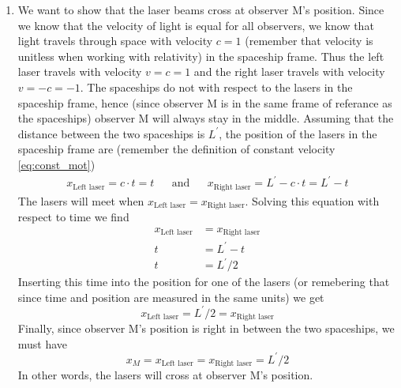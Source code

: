 \documentclass[a4paper,10pt,english]{article}
\begin{document}
\begin{enumerate}
\item We want to show that the laser beams cross at observer M's position. Since we know that the velocity of light is equal for all observers, we know that light travels through space with velocity $c=1$ (remember that velocity is unitless when working with relativity) in the spaceship frame. Thus the left laser travels with velocity $v=c=1$ and the right laser travels with velocity $v=-c=-1$. The spaceships do not with respect to the lasers in the spaceship frame, hence (since observer M is in the same frame of referance as the spaceships) observer M will always stay in the middle. Assuming that the distance between the two spaceships is $L^{\prime}$, the position of the lasers in the spaceship frame are (remember the definition of constant velocity \ref{eq:const_mot})
\begin{align*}
x_{\text{Left laser}}=c\cdot t=t &&\text{and}&& x_{\text{Right laser}}=L^{\prime}-c\cdot t=L^{\prime}-t
\end{align*}
The lasers will meet when $x_{\text{Left laser}}=x_{\text{Right laser}}$. Solving this equation with respect to time we find
\begin{align*}
x_{\text{Left laser}}&=x_{\text{Right laser}}\\
t&=L^{\prime}-t\\
t&=L^{\prime}/2
\end{align*}
Inserting this time into the position for one of the lasers (or remebering that since time and position are measured in the same units) we get 
\[x_{\text{Left laser}}=L^{\prime}/2=x_{\text{Right laser}}\]
Finally, since observer M's position is right in between the two spaceships, we must have 
\[x_{M}=x_{\text{Left laser}}=x_{\text{Right laser}}=L^{\prime}/2\]
In other words, the lasers will cross at observer M's position.


\end{enumerate}
\end{document}
